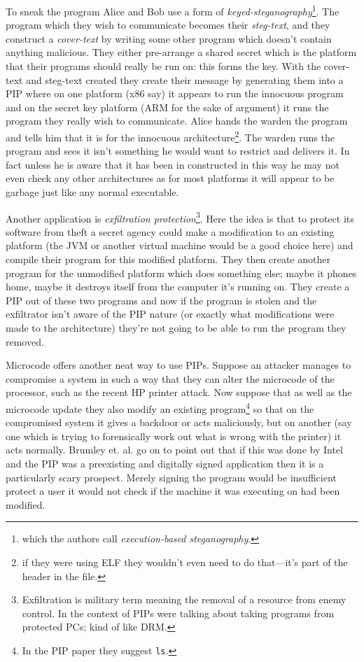 To sneak the program Alice and Bob use a form of
\emph{keyed-steganography}\footnote{which the authors\citep{Brumley2010}
  call \emph{execution-based steganography}.}. The program which they
wish to communicate becomes their \emph{steg-text}, and they construct a
\emph{cover-text} by writing some other program which doesn't contain
anything malicious. They either pre-arrange a shared secret which is the
platform that their programs should really be run on: this forms the
key. With the cover-text and steg-text created they create their message
by generating them into a PIP where on one platform (x86 say) it appears
to run the innocuous program and on the secret key platform (ARM for the
sake of argument) it runs the program they really wish to communicate.
Alice hands the warden the program and tells him that it is for the
innocuous architecture\footnote{if they were using ELF they wouldn't
  even need to do that---it's part of the header in the
  file\citep{SysVElf}.}. The warden runs the program and sees it isn't
something he would want to restrict and delivers it. In fact unless he
is aware that it has been in constructed in this way he may not even
check any other architectures as for most platforms it will appear to be
garbage just like any normal executable.

Another application is \emph{exfiltration protection}\footnote{Exfiltration
  is military term meaning the removal of a resource from enemy control.
  In the context of PIPs were talking about taking programs from
  protected PCs; kind of like DRM.}. Here the idea is that to protect
its software from theft a secret agency could make a modification to an
existing platform (the JVM or another virtual machine would be a good
choice here) and compile their program for this modified platform. They
then create another program for the unmodified platform which does
something else; maybe it phones home, maybe it destroys itself from the
computer it's running on. They create a PIP out of these two programs
and now if the program is stolen and the exfiltrator isn't aware of the
PIP nature (or exactly what modifications were made to the architecture)
they're not going to be able to run the program they removed.

Microcode offers another neat way to use PIPs. Suppose an attacker
manages to compromise a system in such a way that they can alter the
microcode of the processor, such as the recent HP printer
attack\citep{PrintMe2011}. Now suppose that as well as the microcode
update they also modify an existing program\footnote{In the PIP
  paper\citep{Brumley2010} they suggest \lstinline!ls!.} so that on the
compromised system it gives a backdoor or acts maliciously, but on
another (say one which is trying to forensically work out what is wrong
with the printer) it acts normally. Brumley et. al. go on to point
out\citep{Brumley2010} that if this was done by Intel and the PIP was a
preexisting and digitally signed application then it is a particularly
scary prospect. Merely signing the program would be insufficient protect
a user it would not check if the machine it was executing on had been
modified.

